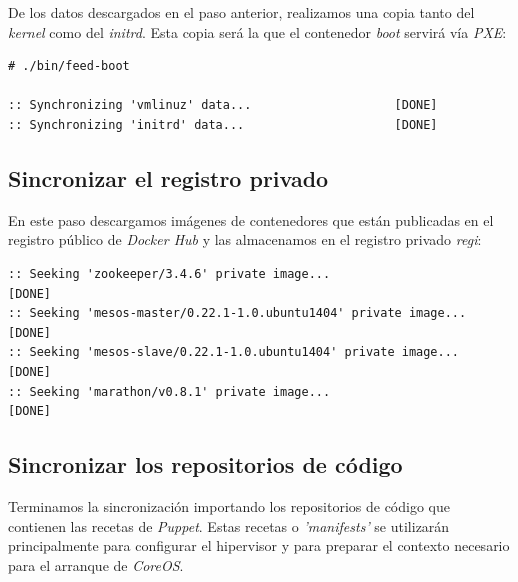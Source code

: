 \documentclass[a4paper,12pt,spanish,final]{epsc_tfc_pfc}
\begin{document}
De los datos descargados en el paso anterior, realizamos una copia tanto del \emph{kernel} como del \emph{initrd}. Esta copia será la que el contenedor \emph{boot} servirá vía \emph{PXE}:\\

\begin{lstlisting}[style=dnsmasq]
# ./bin/feed-boot

:: Synchronizing 'vmlinuz' data...                    [DONE]
:: Synchronizing 'initrd' data...                     [DONE]
\end{lstlisting}

\subsection{Sincronizar el registro privado}

En este paso descargamos imágenes de contenedores que están publicadas en el registro público de \emph{Docker Hub} y las almacenamos en el registro privado \emph{regi}:\\

\begin{lstlisting}[style=dnsmasq]
:: Seeking 'zookeeper/3.4.6' private image...                               [DONE]
:: Seeking 'mesos-master/0.22.1-1.0.ubuntu1404' private image...            [DONE]
:: Seeking 'mesos-slave/0.22.1-1.0.ubuntu1404' private image...             [DONE]
:: Seeking 'marathon/v0.8.1' private image...                               [DONE]
\end{lstlisting}

\subsection{Sincronizar los repositorios de código}

Terminamos la sincronización importando los repositorios de código que contienen las recetas de \emph{Puppet}. Estas recetas o \emph{'manifests'} se utilizarán principalmente para configurar el hipervisor y para preparar el contexto necesario para el arranque de \emph{CoreOS}.\\
\end{document}
